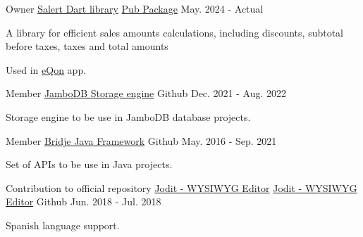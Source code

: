 
\begin{cventries}

  \cventry
    {Owner} %
    {\href{https://github.com/zp1ke/salert}{Salert Dart library}} %
    {\href{https://pub.dev/packages/salert}{Pub Package}} %
    {May. 2024 - Actual} %
    {
      \begin{cvitems} %
        \item {A library for efficient sales amounts calculations, including discounts, subtotal before taxes, taxes and total amounts}
        \item {Used in {\href{https://eqon.ec/}{eQon}} app.}
      \end{cvitems}
    }

  \cventry
    {Member} %
    {\href{https://github.com/jambodb/jambodb-storage}{JamboDB Storage engine}} %
    {\faGithubSquare\acvHeaderIconSep Github} %
    {Dec. 2021 - Aug. 2022} %
    {
      \begin{cvitems} %
        \item {Storage engine to be use in JamboDB database projects.}
      \end{cvitems}
    }

  \cventry
    {Member} %
    {\href{https://github.com/touwolf/bridje-framework}{Bridje Java Framework}} %
    {\faGithubSquare\acvHeaderIconSep Github} %
    {May. 2016 - Sep. 2021} %
    {
      \begin{cvitems} %
        \item {Set of APIs to be use in Java projects.}
      \end{cvitems}
    }

  \cventry
    {Contribution to official repository \href{https://github.com/xdan/jodit}{Jodit - WYSIWYG Editor}} %
    {\href{https://github.com/zp1ke/jodit}{Jodit - WYSIWYG Editor}} %
    {\faGithubSquare\acvHeaderIconSep Github} %
    {Jun. 2018 - Jul. 2018} %
    {
      \begin{cvitems} %
        \item {Spanish language support.}
      \end{cvitems}
    }


\end{cventries}
